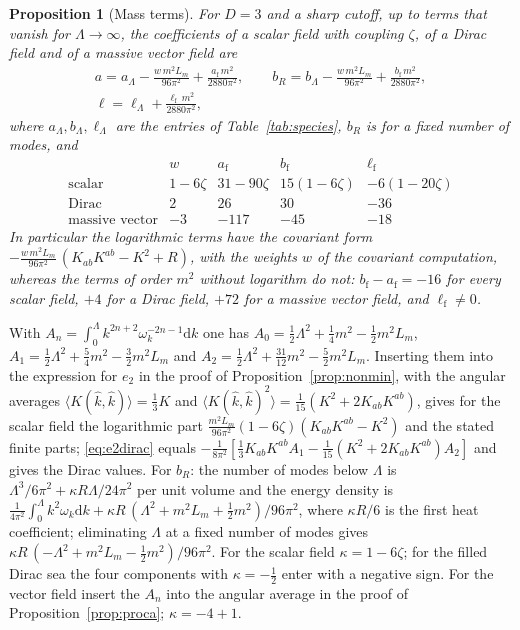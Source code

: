 \documentclass[11pt,a4paper]{article}
\makeatletter
\theoremstyle{stmt}
\newtheorem{proposition}[theorem]{Proposition}
\theoremstyle{defn}
\theoremstyle{rmk}
\renewenvironment{proof}[1][\proofname]{\par\pushQED{\qed}\normalfont\topsep6\p@\@plus6\p@\relax
  \trivlist\item[\hskip\labelsep{\sffamily\itshape\small #1.}]\ignorespaces}{\popQED\endtrivlist\@endpefalse}
\numberwithin{equation}{section}
\newcommand{\dd}{\mathrm{d}}
\makeatother
\begin{document}
\begin{proposition}[Mass terms]\label{prop:massterms}
For $D=3$ and a sharp cutoff, up to terms that vanish for $\Lambda\to\infty$, the coefficients of a scalar field with coupling $\zeta$, of a Dirac field and of a massive vector field are
\begin{equation}\label{eq:massterms}
\begin{gathered}
a=a_\Lambda-\frac{w\,m^2L_m}{96\pi^2}+\frac{a_{\mathrm f}\,m^2}{2880\pi^2},\qquad
b_R=b_\Lambda-\frac{w\,m^2L_m}{96\pi^2}+\frac{b_{\mathrm f}\,m^2}{2880\pi^2},\\
\ell=\ell_\Lambda+\frac{\ell_{\mathrm f}\,m^2}{2880\pi^2},
\end{gathered}
\end{equation}
where $a_\Lambda,b_\Lambda,\ell_\Lambda$ are the entries of Table~\ref{tab:species}, $b_R$ is for a fixed number of modes, and
\[
\begin{array}{lcccc}
 & w & a_{\mathrm f} & b_{\mathrm f} & \ell_{\mathrm f}\\
\text{scalar} & 1-6\zeta & 31-90\zeta & 15(1-6\zeta) & -6(1-20\zeta)\\
\text{Dirac} & 2 & 26 & 30 & -36\\
\text{massive vector} & -3 & -117 & -45 & -18
\end{array}
\]
In particular the logarithmic terms have the covariant form $-\frac{w\,m^2L_m}{96\pi^2}\,(K_{ab}K^{ab}-K^2+R)$, with the weights $w$ of the covariant computation, whereas the terms of order $m^2$ without logarithm do not: $b_{\mathrm f}-a_{\mathrm f}=-16$ for every scalar field, $+4$ for a Dirac field, $+72$ for a massive vector field, and $\ell_{\mathrm f}\neq0$.
\end{proposition}

\begin{proof}
With $A_n=\int_0^\Lambda k^{2n+2}\omega_k^{-2n-1}\dd k$ one has $A_0=\tfrac12\Lambda^2+\tfrac14m^2-\tfrac12m^2L_m$, $A_1=\tfrac12\Lambda^2+\tfrac54m^2-\tfrac32m^2L_m$ and $A_2=\tfrac12\Lambda^2+\tfrac{31}{12}m^2-\tfrac52m^2L_m$. Inserting them into the expression for $e_2$ in the proof of Proposition~\ref{prop:nonmin}, with the angular averages $\langle K(\hat k,\hat k)\rangle=\tfrac13K$ and $\langle K(\hat k,\hat k)^2\rangle=\tfrac1{15}(K^2+2K_{ab}K^{ab})$, gives for the scalar field the logarithmic part $\frac{m^2L_m}{96\pi^2}(1-6\zeta)(K_{ab}K^{ab}-K^2)$ and the stated finite parts; \eqref{eq:e2dirac} equals $-\frac{1}{8\pi^2}[\tfrac13K_{ab}K^{ab}A_1-\tfrac1{15}(K^2+2K_{ab}K^{ab})A_2]$ and gives the Dirac values. For $b_R$: the number of modes below $\Lambda$ is $\Lambda^3/6\pi^2+\kappa R\Lambda/24\pi^2$ per unit volume and the energy density is $\frac1{4\pi^2}\int_0^\Lambda k^2\omega_k\dd k+\kappa R\,(\Lambda^2+m^2L_m+\tfrac12m^2)/96\pi^2$, where $\kappa R/6$ is the first heat coefficient; eliminating $\Lambda$ at a fixed number of modes gives $\kappa R\,(-\Lambda^2+m^2L_m-\tfrac12m^2)/96\pi^2$. For the scalar field $\kappa=1-6\zeta$; for the filled Dirac sea the four components with $\kappa=-\tfrac12$ enter with a negative sign. For the vector field insert the $A_n$ into the angular average in the proof of Proposition~\ref{prop:proca}; $\kappa=-4+1$.
\end{proof}
\end{document}
